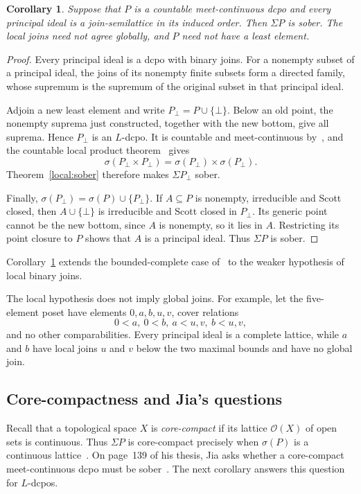 \documentclass[fleqn,preprint,3p,a4paper]{elsarticle}
\newtheorem{corollary}[theorem]{Corollary}
\theoremstyle{definition}
\begin{document}
\begin{corollary}\label{local:countable}
Suppose that $P$ is a countable meet-continuous dcpo and every principal ideal is a join-semilattice in its induced order. Then $\Sigma P$ is sober. The local joins need not agree globally, and $P$ need not have a least element.
\end{corollary}
\begin{proof}
Every principal ideal is a dcpo with binary joins. For a nonempty subset of a principal ideal, the joins of its nonempty finite subsets form a directed family, whose supremum is the supremum of the original subset in that principal ideal.

Adjoin a new least element and write $P_\bot=P\cup\{\bot\}$. Below an old point, the nonempty suprema just constructed, together with the new bottom, give all suprema. Hence $P_\bot$ is an $L$-dcpo. It is countable and meet-continuous by~\cite[Lemma~4.1]{Xu}, and the countable local product theorem~\cite[Theorem~3.4]{Xu} gives
\[
 \sigma(P_\bot\times P_\bot)=\sigma(P_\bot)\times\sigma(P_\bot).
\]
Theorem~\ref{local:sober} therefore makes $\Sigma P_\bot$ sober.

Finally, $\sigma(P_\bot)=\sigma(P)\cup\{P_\bot\}$. If $A\subseteq P$ is nonempty, irreducible and Scott closed, then $A\cup\{\bot\}$ is irreducible and Scott closed in $P_\bot$. Its generic point cannot be the new bottom, since $A$ is nonempty, so it lies in $A$. Restricting its point closure to $P$ shows that $A$ is a principal ideal. Thus $\Sigma P$ is sober.
\end{proof}

Corollary~\ref{local:countable} extends the bounded-complete case of~\cite[Proposition~4.3]{Xu} to the weaker hypothesis of local binary joins.

The local hypothesis does not imply global joins. For example, let the five-element poset have elements $0,a,b,u,v$, cover relations
\[
 0<a,~ 0<b,~ a<u,v,~ b<u,v,
\]
and no other comparabilities. Every principal ideal is a complete lattice, while $a$ and $b$ have local joins $u$ and $v$ below the two maximal bounds and have no global join.

\subsection{Core-compactness and Jia's questions}\label{local:subsec:jia}
Recall that a topological space $X$ is \emph{core-compact} if its lattice $\mathcal O(X)$ of open sets is continuous. Thus $\Sigma P$ is core-compact precisely when $\sigma(P)$ is a continuous lattice~\cite[Definition~2.5.1]{Jia}. On page~139 of his thesis, Jia asks whether a core-compact meet-continuous dcpo must be sober~\cite[Question~4.5.8]{Jia}. The next corollary answers this question for $L$-dcpos.
\end{document}
